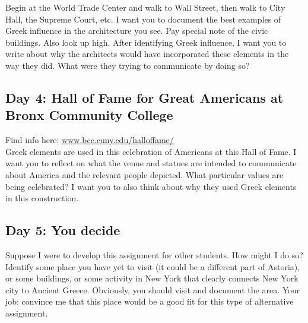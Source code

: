 \documentclass{article}
\begin{document}
Begin  at  the  World  Trade  Center  and  walk  to  Wall  Street,  then  walk  to  City  Hall,  the  Supreme  Court,  etc.  I  want  you  to  document  the  best  examples  of  Greek  influence  in  the  architecture  you  see.  Pay  special  note  of  the  civic  buildings.  Also  look  up  high.  After  identifying  Greek  influence,  I  want  you  to  write  about  why  the  architects  would  have  incorporated  these  elements  in  the  way  they  did.  What  were  they  trying  to  communicate  by  doing  so? 

\subsection*{Day  4: Hall  of  Fame  for  Great  Americans  at  Bronx  Community  College}

Find  info here:  \url{www.bcc.cuny.edu/halloffame/}\\ 

Greek  elements  are  used  in  this  celebration  of  Americans at this Hall of Fame.  I  want  you  to  reflect  on  what  the  venue  and  statues  are  intended  to  communicate  about  America  and  the  relevant  people  depicted.  What  particular  values  are  being  celebrated?  I  want  you  to  also  think  about  why  they  used  Greek  elements  in  this  construction.    

\subsection*{Day  5:  You  decide}  

Suppose  I  were  to  develop  this  assignment  for  other  students.  How  might  I  do  so?  Identify  some  place  you  have  yet  to  visit  (it  could  be  a  different  part  of  Astoria),  or  some  buildings,  or  some  activity  in  New  York  that  clearly  connects  New  York  city  to  Ancient  Greece.  Obviously,  you  should  visit  and  document  the  area.    Your  job:  convince  me  that  this  place  would  be  a  good  fit  for  this  type  of  alternative  assignment.   
\end{document}
